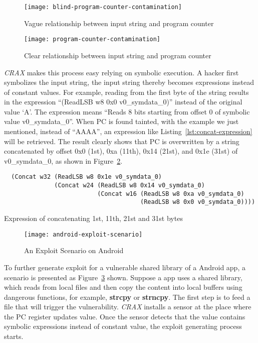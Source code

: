 \begin{figure}[!ht]
  \texttt{[image: blind-program-counter-contamination]}
  \caption{Vague relationship between input string and program counter}
  \label{fig:blind-program-counter-contamination}
\end{figure}

\begin{figure}[!ht]
  \texttt{[image: program-counter-contamination]}
  \caption{Clear relationship between input string and program counter}
  \label{fig:program-counter-contamination}
\end{figure}

\emph{CRAX} makes this process easy relying on symbolic execution. A hacker
first symbolizes the input string, the input string thereby becomes expressions
instead of constant values. For example, reading from the first byte of the
string results in the expression ``(ReadLSB w8 0x0 v0\_symdata\_0)'' instead of
the original value `A'. The expression means ``Reads 8 bits starting from
offset 0 of symbolic value v0\_symdata\_0''. When PC is found tainted, with the
example we just mentioned, instead of ``AAAA'', an expression like
Listing~\ref{lst:concat-expression} will be retrieved. The result clearly shows
that PC is overwritten by a string concatenated by offset 0x0 (1st),
0xa (11th), 0x14 (21st), and 0x1e (31st) of v0\_symdata\_0, as shown in
Figure~\ref{fig:program-counter-contamination}.

\begin{listing}[H]
  \begin{verbatim}
  (Concat w32 (ReadLSB w8 0x1e v0_symdata_0)
              (Concat w24 (ReadLSB w8 0x14 v0_symdata_0)
                          (Concat w16 (ReadLSB w8 0xa v0_symdata_0)
                                      (ReadLSB w8 0x0 v0_symdata_0))))
  \end{verbatim}
  \caption{Expression of concatenating 1st, 11th, 21st and 31st bytes}
  \label{lst:concat-expression}
\end{listing}

\begin{figure}[!ht]
  \texttt{[image: android-exploit-scenario]}
  \caption{An Exploit Scenario on Android}
  \label{fig:android-exploit-scenario}
\end{figure}

To further generate exploit for a vulnerable shared library of a Android app, a
scenario is presented as Figure~\ref{fig:android-exploit-scenario} shown.
Suppose a app uses a shared library, which reads from local files and then copy
the content into local buffers using dangerous functions, for example,
\textbf{strcpy} or \textbf{strncpy}. The first step is to feed a file that will
trigger the vulnerability. \emph{CRAX} installs a sensor at the place where the
PC register updates value. Once the sensor detects that the value contains
symbolic expressions instead of constant value, the exploit generating process
starts.

